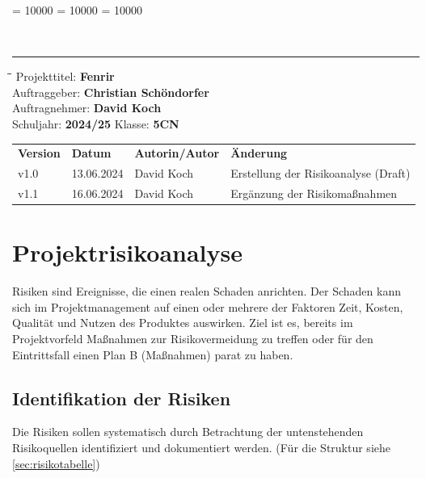 \documentclass[
	headings=optiontotocandhead,%
	oneside,
	numbers=noenddot,%
	toc=flat, %
	10pt, %
	parskip=full, %
	listof=totoc, %
	listof=flat, %
	numbers=noenddot, %
	bibliography=totoc, %
	a4paper,DIV=14,
]{scrartcl}
\newcommand\Tstrut{\rule{0pt}{3.2ex}}         %
\newcommand\Bstrut{\rule[-1.5ex]{0pt}{0pt}}   %
\newenvironment{nstabbing}
	{\setlength{\topsep}{-\parskip}
		\setlength{\partopsep}{-\parskip}
		\tabbing}
	{\endtabbing}
\begin{document}
\clubpenalty = 10000 %
\widowpenalty = 10000 %
\displaywidowpenalty = 10000

{\sffamily{\textbf{\LARGE{\textcolor{orange}{Spielregeln}}}}}\\
\noindent\rule{\textwidth}{0.1pt}
\begin{nstabbing}
	\hspace{4cm}\=\hspace{4cm}\=\hspace{4cm}\=\kill
	Projekttitel: \> \textbf{Fenrir}\\
	Auftraggeber: \> \textbf{Christian Schöndorfer}\\
	Auftragnehmer: \> \textbf{David Koch}\\
	Schuljahr: \> \textbf{2024/25}
	\> Klasse: \> \textbf{5CN}\\
\end{nstabbing}
{\smaller
	\begin{tabularx}{\textwidth}{l l l l}
	\hline
	\textbf{Version} & \textbf{Datum} & \textbf{Autorin/Autor} & \textbf{Änderung}\Tstrut  \\
	v1.0 & 13.06.2024 & David Koch & Erstellung der Risikoanalyse (Draft) \\
	v1.1 & 16.06.2024 & David Koch & Ergänzung der Risikomaßnahmen\Bstrut \\
	\hline
	\end{tabularx}
}

\section{Projektrisikoanalyse}
Risiken sind Ereignisse, die einen realen Schaden anrichten. Der Schaden kann sich im Projektmanagement auf einen oder mehrere der Faktoren Zeit, Kosten, Qualität und Nutzen des Produktes auswirken. Ziel ist es, bereits im Projektvorfeld Maßnahmen zur Risikovermeidung zu treffen oder für den Eintrittsfall einen Plan B (Maßnahmen) parat zu haben.

\subsection{Identifikation der Risiken}
Die Risiken sollen systematisch durch Betrachtung der untenstehenden Risikoquellen identifiziert und dokumentiert werden. (Für die Struktur siehe \autoref{sec:risikotabelle})
\end{document}

